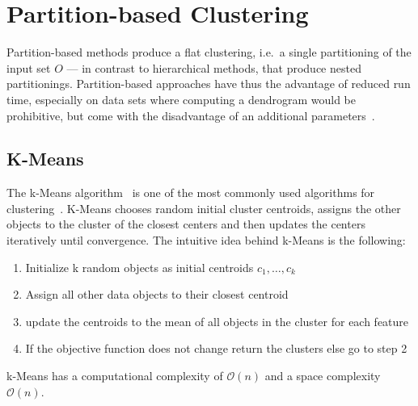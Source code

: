 \section{Partition-based Clustering}\label{\positionnumber}
Partition-based methods produce a flat clustering, i.e.~a single partitioning of the input set $O$ --- in contrast to hierarchical methods, that produce nested partitionings. Partition-based approaches have thus the advantage of reduced run time, especially on data sets where computing a dendrogram would be prohibitive, but come with the disadvantage of an additional parameters~\cite{han2011data, THEODORIDIS2009701}.\\ 

\subsection{K-Means}\label{\positionnumber}
The k-Means algorithm~\cite{lloyd1982least, macqueen1967some} is one of the most commonly used algorithms for clustering~\cite{Jin2010}. K-Means chooses random initial cluster centroids, assigns the other objects to the cluster of the closest centers and then updates the centers iteratively until convergence. The intuitive idea behind k-Means is the following: 
\begin{enumerate}
    \item Initialize k random objects as initial centroids $c_1, \dots, c_k$
    \item Assign all other data objects to their closest centroid
    \item update the centroids to the mean of all objects in the cluster for each feature
    \item If the objective function does not change return the clusters else go to step 2
\end{enumerate}
k-Means has a computational complexity of $\mathcal{O}(n)$ and a space complexity $\mathcal{O}(n)$. \\


